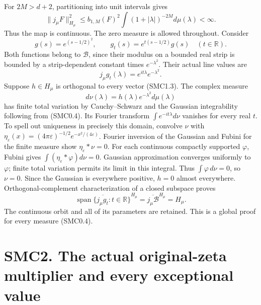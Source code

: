 For \(2M>d+2\), partitioning into unit intervals gives \[
\|j_\mu F\|_{H_\mu}^2
\le b_{1,M}(F)^2\int(1+|\lambda|)^{-2M}d\mu(\lambda)<\infty.
\tag{SMC1.1}
\] Thus the map is continuous. The zero measure is allowed throughout.
Consider \[
g(s)=e^{(s-1/2)^2},\qquad
g_t(s)=e^{t(s-1/2)}g(s)\quad(t\in\mathbb R).
\tag{SMC1.2}
\] Both functions belong to \(\mathcal B\), since their modulus on a
bounded real strip is bounded by a strip-dependent constant times
\(e^{-\lambda^2}\). Their actual line values are \[
j_\mu g_t(\lambda)=e^{it\lambda}e^{-\lambda^2}.
\tag{SMC1.3}
\] Suppose \(h\in H_\mu\) is orthogonal to every vector (SMC1.3). The
complex measure \[
d\nu(\lambda)=h(\lambda)e^{-\lambda^2}d\mu(\lambda)
\tag{SMC1.4}
\] has finite total variation by Cauchy--Schwarz and the Gaussian
integrability following from (SMC0.4). Its Fourier transform
\(\int e^{-it\lambda}d\nu\) vanishes for every real \(t\). To spell out
uniqueness in precisely this domain, convolve \(\nu\) with
\(\eta_\varepsilon(x)=(4\pi\varepsilon)^{-1/2}e^{-x^2/(4\varepsilon)}\).
Fourier inversion of the Gaussian and Fubini for the finite measure show
\(\eta_\varepsilon*\nu=0\). For each continuous compactly supported
\(\varphi\), Fubini gives \(\int(\eta_\varepsilon*\varphi)d\nu=0\).
Gaussian approximation converges uniformly to \(\varphi\); finite total
variation permits its limit in this integral. Thus
\(\int\varphi\,d\nu=0\), so \(\nu=0\). Since the Gaussian is everywhere
positive, \(h=0\) almost everywhere. Orthogonal-complement
characterization of a closed subspace proves \[
\overline{\operatorname{span}\{j_\mu g_t:t\in\mathbb R\}}^{H_\mu}
=\overline{j_\mu\mathcal B}^{H_\mu}=H_\mu.
\tag{SMC1.5}
\] The continuous orbit and all of its parameters are retained. This is
a global proof for every measure (SMC0.4).

\section{SMC2. The actual original-zeta multiplier and every exceptional
value}\label{smc2.-the-actual-original-zeta-multiplier-and-every-exceptional-value}

